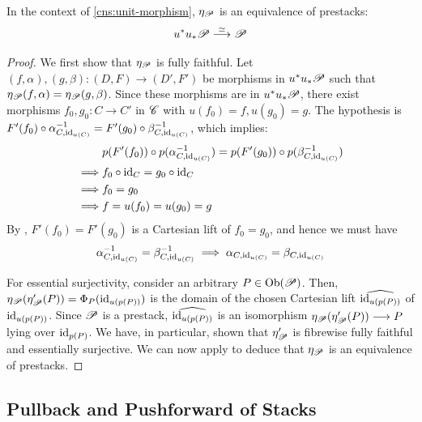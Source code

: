 \documentclass[11pt]{amsart}
\begin{document}
\begin{prop}\label{prop:prest-pull-push-equiv}
In the context of \cref{cns:unit-morphism}, $\eta_\mathscr{P}$ is an equivalence
of prestacks:
\[
u^*u_*\sP \to[\simeq] \sP
\]
\end{prop}
\begin{proof}
We first show that $\eta_\mathscr{P}$ is fully faithful.
Let $(f, \alpha), (g, \beta) : (D, F) \to (D', F')$ be morphisms in $u^*u_*\mathscr{P}$ such that
$\eta_\mathscr{P}(f, \alpha) = \eta_\mathscr{P}(g, \beta)$. Since these morphisms are in $u^*u_*\mathscr{P}$,
there exist morphisms $f_0, g_0 : C \to C'$ in $\mathscr{C}$ with $u(f_0) = f, u(g_0) = g$. The hypothesis
is $F'(f_0) \circ \alpha_{C, \mathrm{id}_{u(C)}}^{-1} = F'(g_0) \circ \beta_{C, \mathrm{id}_{u(C)}}^{-1}$,
which implies:
\begin{align*}
& p(F'(f_0)) \circ p(\alpha_{C, \mathrm{id}_{u(C)}}^{-1})
    = p(F'(g_0)) \circ p(\beta_{C, \mathrm{id}_{u(C)}}^{-1}) \\
\implies& f_0 \circ \mathrm{id}_C = g_0 \circ \mathrm{id}_C \\
\implies& f_0 = g_0 \\
\implies& f = u(f_0) = u(g_0) = g
\end{align*}
By \cite[\href{https://stacks.math.columbia.edu/tag/003V}{Lemma 003V}]{stacks-project},
$F'(f_0) = F'(g_0)$ is a Cartesian lift of $f_0 = g_0$, and hence
we must have
\[
\alpha_{C, \mathrm{id}_{u(C)}}^{-1} = \beta_{C, \mathrm{id}_{u(C)}}^{-1}
\implies \alpha_{C, \mathrm{id}_{u(C)}} = \beta_{C, \mathrm{id}_{u(C)}}
\]

For essential surjectivity, consider an arbitrary $P \in \Ob{\sP}$.
Then, $\eta_\mathscr{P}(\eta'_\mathscr{P}(P)) = \Phi_P(\mathrm{id}_{u(p(P))})$ is the domain
of the chosen Cartesian lift $\widehat{\mathrm{id}_{u(p(P))}}$ of $\mathrm{id}_{u(p(P))}$. Since $\mathscr{P}$ is a prestack,
$\widehat{\mathrm{id}_{u(p(P))}}$ is an isomorphism $\eta_\sP(\eta'_\sP(P)) \to P$ lying over $\mathrm{id}_{p(P)}$.
We have, in particular, shown that $\eta'_\mathscr{P}$ is fibrewise fully faithful and essentially
surjective.
We can now apply \cite[\href{https://stacks.math.columbia.edu/tag/003Z}{Lemma 003Z}]{stacks-project}
to deduce that $\eta_\mathscr{P}$ is an equivalence of prestacks.
\end{proof}

\subsection{Pullback and Pushforward of Stacks}
\label{subsec:pullback-pushfwd-st}
\end{document}
